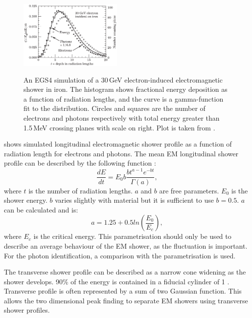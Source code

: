 \begin{figure}[tbph]
\centering
{\includegraphics[width=0.45\textwidth]{photon/EMlong}}
\caption[Simulated longitudinal electromagnetic shower profile as a function of depth for electrons and photons.]
{An EGS4 simulation of a 30\,GeV electron-induced electromagnetic shower in iron. The histogram shows fractional energy deposition as a function of radiation lengths, and the curve is a gamma-function fit to the distribution. Circles and squares are the number of electrons and photons respectively with total energy greater than 1.5\,MeV crossing planes with scale on right. Plot is taken from \cite{Agashe:2014kda}.}
\label{fig:photonEMlongProfile}
\end{figure}

 shows simulated longitudinal electromagnetic shower profile as a function of radiation length for electrons and photons. The mean EM longitudinal shower profile can be described by the following function \cite{Longo:1975wb} :
\begin{equation}
\frac{dE}{dt} = E_0 b \frac{{bt}^{a-1}e^{-bt}}{\Gamma(a)},
\end{equation}
where $t$ is the number of radiation lengths. $a$ and $b$ are free parameters. $E_0$ is the shower energy. $b$ varies slightly with material but it is sufficient to use $b = 0.5$. $a$ can be calculated and is:
\begin{equation}
a = 1.25 + 0.5ln\left(\frac{E_0}{E_c}\right),
\end{equation}
where $E_c$ is the critical energy. This parametrisation should only be used to describe an average behaviour of the EM shower, as the fluctuation is important. For the photon identification, a comparison with the parametrisation is used.

The transverse shower profile can be described as  a narrow cone widening as the shower develops. 90\% of the energy  is contained in a fiducial cylinder of 1 \RM. Transverse profile is often represented by a sum of two Gaussian function. This allows the two dimensional peak finding to separate EM showers using transverse shower profiles.

